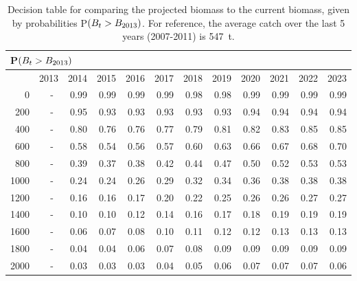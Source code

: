 \begin{table}[ht]
\begin{center}
\caption{Decision table for comparing the projected biomass to the current biomass, given by probabilities P$(B_t > B_{2013})$. For reference, the average catch over the last 5 years (2007-2011) is 547~t.}
\label{tab:Bcurr.10yr}
\begin{tabular}{rrrrrrrrrrrr}
\multicolumn{12}{l}{P$(B_t > B_{2013})$} \\
  \hline
 & 2013 & 2014 & 2015 & 2016 & 2017 & 2018 & 2019 & 2020 & 2021 & 2022 & 2023 \\ 
  \hline
0 & -~ & 0.99 & 0.99 & 0.99 & 0.99 & 0.98 & 0.98 & 0.99 & 0.99 & 0.99 & 0.99 \\ 
  200 & -~ & 0.95 & 0.93 & 0.93 & 0.93 & 0.93 & 0.93 & 0.94 & 0.94 & 0.94 & 0.94 \\ 
  400 & -~ & 0.80 & 0.76 & 0.76 & 0.77 & 0.79 & 0.81 & 0.82 & 0.83 & 0.85 & 0.85 \\ 
  600 & -~ & 0.58 & 0.54 & 0.56 & 0.57 & 0.60 & 0.63 & 0.66 & 0.67 & 0.68 & 0.70 \\ 
  800 & -~ & 0.39 & 0.37 & 0.38 & 0.42 & 0.44 & 0.47 & 0.50 & 0.52 & 0.53 & 0.53 \\ 
  1000 & -~ & 0.24 & 0.24 & 0.26 & 0.29 & 0.32 & 0.34 & 0.36 & 0.38 & 0.38 & 0.38 \\ 
  1200 & -~ & 0.16 & 0.16 & 0.17 & 0.20 & 0.22 & 0.25 & 0.26 & 0.26 & 0.27 & 0.27 \\ 
  1400 & -~ & 0.10 & 0.10 & 0.12 & 0.14 & 0.16 & 0.17 & 0.18 & 0.19 & 0.19 & 0.19 \\ 
  1600 & -~ & 0.06 & 0.07 & 0.08 & 0.10 & 0.11 & 0.12 & 0.12 & 0.13 & 0.13 & 0.13 \\ 
  1800 & -~ & 0.04 & 0.04 & 0.06 & 0.07 & 0.08 & 0.09 & 0.09 & 0.09 & 0.09 & 0.09 \\ 
  2000 & -~ & 0.03 & 0.03 & 0.03 & 0.04 & 0.05 & 0.06 & 0.07 & 0.07 & 0.07 & 0.06 \\ 
   \hline
\end{tabular}
\end{center}
\end{table}


